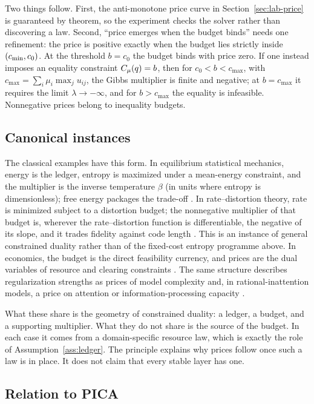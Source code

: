 Two things follow. First, the anti-monotone price curve in Section~\ref{sec:lab-price} is guaranteed by theorem, so the experiment checks the solver rather than discovering a law. Second, ``price emerges when the budget binds'' needs one refinement: the price is positive exactly when the budget lies strictly inside \((c_{\min},c_0)\). At the threshold \(b=c_0\) the budget binds with price zero. If one instead imposes an equality constraint \(C_{\mu}(q)=b\), then for \(c_0<b<c_{\max}\), with \(c_{\max}=\sum_i\mu_i\max_ju_{ij}\), the Gibbs multiplier is finite and negative; at \(b=c_{\max}\) it requires the limit \(\lambda\to-\infty\), and for \(b>c_{\max}\) the equality is infeasible. Nonnegative prices belong to inequality budgets.

\subsection{Canonical instances}

The classical examples have this form. In equilibrium statistical mechanics, energy is the ledger, entropy is maximized under a mean-energy constraint, and the multiplier is the inverse temperature \(\beta\) (in units where entropy is dimensionless); free energy packages the trade-off \cite{jaynes1957information,presse2013maxent}. In rate--distortion theory, rate is minimized subject to a distortion budget; the nonnegative multiplier of that budget is, wherever the rate--distortion function is differentiable, the negative of its slope, and it trades fidelity against code length \cite{berger1971ratedistortion,coverthomas2006}. This is an instance of general constrained duality rather than of the fixed-cost entropy programme above. In economics, the budget is the direct feasibility currency, and prices are the dual variables of resource and clearing constraints \cite{arrowdebreu1954}. The same structure describes regularization strengths as prices of model complexity and, in rational-inattention models, a price on attention or information-processing capacity \cite{sims2003rationalinattention}.

What these share is the geometry of constrained duality: a ledger, a budget, and a supporting multiplier. What they do not share is the source of the budget. In each case it comes from a domain-specific resource law, which is exactly the role of Assumption~\ref{ass:ledger}. The principle explains why prices follow once such a law is in place. It does not claim that every stable layer has one.

\subsection{Relation to PICA}

